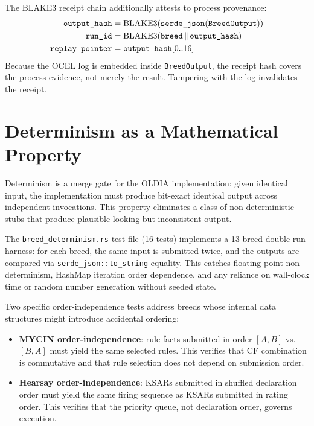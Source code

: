 The BLAKE3 receipt chain additionally attests to process provenance:
\begin{align}
  \texttt{output\_hash} &= \text{BLAKE3}(\texttt{serde\_json}(\texttt{BreedOutput})) \notag\\
  \texttt{run\_id} &= \text{BLAKE3}(\texttt{breed} \,\|\, \texttt{output\_hash}) \notag\\
  \texttt{replay\_pointer} &= \texttt{output\_hash}[0..16] \notag
\end{align}
Because the OCEL log is embedded inside \texttt{BreedOutput}, the receipt hash covers the
process evidence, not merely the result. Tampering with the log invalidates the receipt.

\section{Determinism as a Mathematical Property}
\label{sec:determinism}

Determinism is a merge gate for the OLDIA implementation: given identical input, the
implementation must produce bit-exact identical output across independent invocations. This
property eliminates a class of non-deterministic stubs that produce plausible-looking but
inconsistent output.

The \texttt{breed\_determinism.rs} test file (16 tests) implements a 13-breed double-run
harness: for each breed, the same input is submitted twice, and the outputs are compared via
\texttt{serde\_json::to\_string} equality. This catches floating-point non-determinism,
HashMap iteration order dependence, and any reliance on wall-clock time or random number
generation without seeded state.

Two specific order-independence tests address breeds whose internal data structures might
introduce accidental ordering:

\begin{itemize}
  \item \textbf{MYCIN order-independence}: rule facts submitted in order $[A, B]$ vs.\ $[B, A]$
    must yield the same selected rules. This verifies that CF combination is commutative and
    that rule selection does not depend on submission order.

  \item \textbf{Hearsay order-independence}: KSARs submitted in shuffled declaration order
    must yield the same firing sequence as KSARs submitted in rating order. This verifies
    that the priority queue, not declaration order, governs execution.
\end{itemize}


